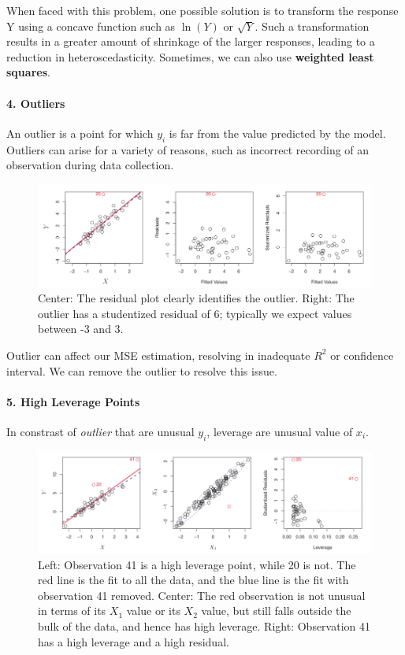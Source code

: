  When faced with this problem, one possible solution is to transform the response Y using a concave function such as $\ln(Y)$ or $\sqrt{Y}$. Such a transformation results in a greater amount of shrinkage of the larger responses, leading to a reduction in heteroscedasticity. Sometimes, we can also use \textbf{weighted least squares}.

\paragraph{4. Outliers}
An outlier is a point for which $y_i$ is far from the value predicted by the model. Outliers can arise for a variety of reasons, such as incorrect recording of an observation during data collection.

\begin{figure}[!ht]
    \centering
    \includegraphics[scale=0.6]{src/StatisticalLearning/Outlier.PNG}
    \caption{Center: The residual plot clearly identifies the outlier. Right: The outlier has a studentized residual of 6; typically we expect values between -3 and 3.}
\end{figure}

Outlier can affect our MSE estimation, resolving in inadequate $R^2$ or confidence interval. We can remove the outlier to resolve this issue.

\paragraph{5. High Leverage Points}
In constrast of \emph{outlier} that are unusual $y_i$, leverage are unusual value of $x_i$. 

\begin{figure}[!ht]
    \centering
    \includegraphics[scale=0.6]{src/StatisticalLearning/Leverage.PNG}
    \caption{Left: Observation 41 is a high leverage point, while 20 is not. The red line is the fit to all the data, and the blue line is the fit with observation 41 removed. Center: The red observation is not unusual in terms of its $X_1$ value or its $X_2$ value, but still falls outside the bulk of the data, and hence has high leverage. Right: Observation 41 has a high leverage and a high residual.}
\end{figure}

